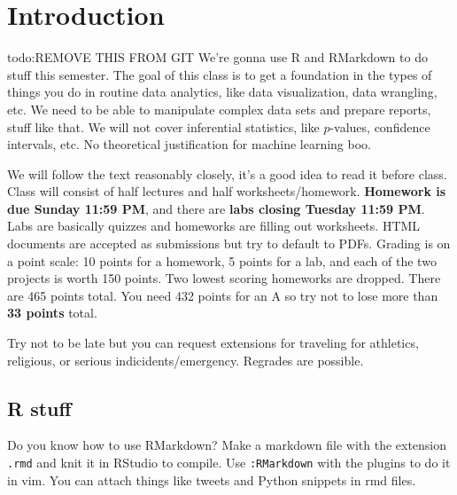 \section{Introduction}
{\color{red}todo:REMOVE THIS FROM GIT} 
We're gonna use R and RMarkdown to do stuff this semester. The goal of this class is to get a foundation in the types of things you do in routine data analytics, like data visualization, data wrangling, etc. We need to be able to manipulate complex data sets and prepare reports, stuff like that. We will not cover inferential statistics, like $p$-values, confidence intervals, etc. No theoretical justification for machine learning boo.

We will follow the text reasonably closely, it's a good idea to read it before class. Class will consist of half lectures and half worksheets/homework. \textbf{Homework is due Sunday 11:59 PM}, and there are \textbf{labs closing Tuesday 11:59 PM}. Labs are basically quizzes and homeworks are filling out worksheets. HTML documents are accepted as submissions but try to default to PDFs. Grading is on a point scale: 10 points for a homework, 5 points for a lab, and each of the two projects is worth 150 points. Two lowest scoring homeworks are dropped. There are 465 points total. You need 432 points for an A so try not to lose more than \textbf{33 points} total.

Try not to be late but you can request extensions for traveling for athletics, religious, or serious indicidents/emergency. Regrades are possible.

\subsection{R stuff}
Do you know how to use RMarkdown? Make a markdown file with the extension \texttt{.rmd} and knit it in RStudio to compile. Use \texttt{:RMarkdown} with the plugins to do it in vim. You can attach things like tweets and Python snippets in rmd files.


